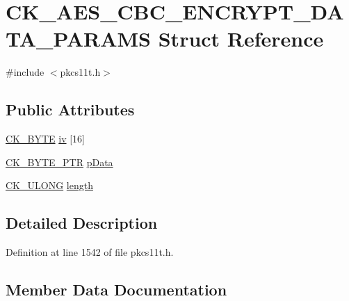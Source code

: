 \hypertarget{struct_c_k___a_e_s___c_b_c___e_n_c_r_y_p_t___d_a_t_a___p_a_r_a_m_s}{}\section{C\+K\+\_\+\+A\+E\+S\+\_\+\+C\+B\+C\+\_\+\+E\+N\+C\+R\+Y\+P\+T\+\_\+\+D\+A\+T\+A\+\_\+\+P\+A\+R\+A\+MS Struct Reference}
\label{struct_c_k___a_e_s___c_b_c___e_n_c_r_y_p_t___d_a_t_a___p_a_r_a_m_s}


{\ttfamily \#include $<$pkcs11t.\+h$>$}

\subsection*{Public Attributes}
\begin{DoxyCompactItemize}
\item 
\hyperlink{pkcs11t_8h_a51e605f881c86838bf12d70707b57b85}{C\+K\+\_\+\+B\+Y\+TE} \hyperlink{struct_c_k___a_e_s___c_b_c___e_n_c_r_y_p_t___d_a_t_a___p_a_r_a_m_s_a78a7a1afad5347f031b78ef05d45d9f0}{iv} \mbox{[}16\mbox{]}
\item 
\hyperlink{pkcs11t_8h_a3d7233a4077fbaf7ae76b64da0a62a21}{C\+K\+\_\+\+B\+Y\+T\+E\+\_\+\+P\+TR} \hyperlink{struct_c_k___a_e_s___c_b_c___e_n_c_r_y_p_t___d_a_t_a___p_a_r_a_m_s_a620cb164c9631f252741d77f9cd56b1e}{p\+Data}
\item 
\hyperlink{pkcs11t_8h_a35181858a3b7a0a81f49d180d8f446ef}{C\+K\+\_\+\+U\+L\+O\+NG} \hyperlink{struct_c_k___a_e_s___c_b_c___e_n_c_r_y_p_t___d_a_t_a___p_a_r_a_m_s_a0126d4f85f76160280fbe734e50a63f0}{length}
\end{DoxyCompactItemize}


\subsection{Detailed Description}


Definition at line 1542 of file pkcs11t.\+h.



\subsection{Member Data Documentation}
\mbox{\label{struct_c_k___a_e_s___c_b_c___e_n_c_r_y_p_t___d_a_t_a___p_a_r_a_m_s_a78a7a1afad5347f031b78ef05d45d9f0}} 
